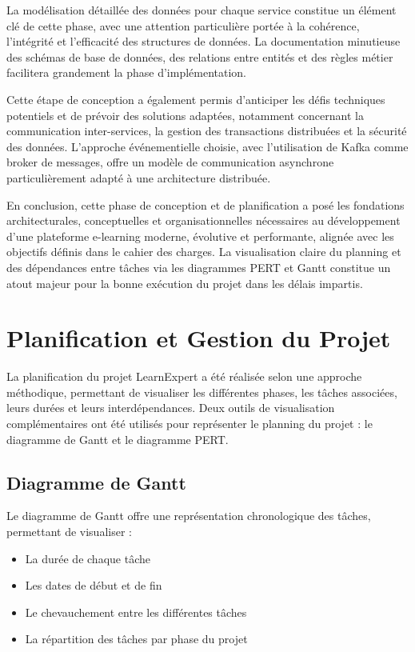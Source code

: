 La modélisation détaillée des données pour chaque service constitue un élément clé de cette phase, avec une attention particulière portée à la cohérence, l'intégrité et l'efficacité des structures de données. La documentation minutieuse des schémas de base de données, des relations entre entités et des règles métier facilitera grandement la phase d'implémentation.

Cette étape de conception a également permis d'anticiper les défis techniques potentiels et de prévoir des solutions adaptées, notamment concernant la communication inter-services, la gestion des transactions distribuées et la sécurité des données. L'approche événementielle choisie, avec l'utilisation de Kafka comme broker de messages, offre un modèle de communication asynchrone particulièrement adapté à une architecture distribuée.

En conclusion, cette phase de conception et de planification a posé les fondations architecturales, conceptuelles et organisationnelles nécessaires au développement d'une plateforme e-learning moderne, évolutive et performante, alignée avec les objectifs définis dans le cahier des charges. La visualisation claire du planning et des dépendances entre tâches via les diagrammes PERT et Gantt constitue un atout majeur pour la bonne exécution du projet dans les délais impartis.

\section{Planification et Gestion du Projet}

La planification du projet LearnExpert a été réalisée selon une approche méthodique, permettant de visualiser les différentes phases, les tâches associées, leurs durées et leurs interdépendances. Deux outils de visualisation complémentaires ont été utilisés pour représenter le planning du projet : le diagramme de Gantt et le diagramme PERT.

\subsection{Diagramme de Gantt}

Le diagramme de Gantt offre une représentation chronologique des tâches, permettant de visualiser :
\begin{itemize}[leftmargin=*,noitemsep,topsep=0pt]
  \item La durée de chaque tâche
  \item Les dates de début et de fin
  \item Le chevauchement entre les différentes tâches
  \item La répartition des tâches par phase du projet
\end{itemize}

